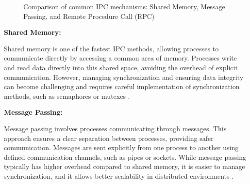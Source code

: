\vspace{1em}
\begin{figure}[H]
	\centering
	\caption{Comparison of common IPC mechanisms: Shared Memory, Message Passing, and Remote Procedure Call (RPC)}
	\label{fig:ipc_methods}
\end{figure}

\vspace{1em}
\textbf{Shared Memory:}

Shared memory is one of the fastest IPC methods, allowing processes to communicate directly by accessing a common area of memory. Processes write and read data directly into this shared space, avoiding the overhead of explicit communication. However, managing synchronization and ensuring data integrity can become challenging and requires careful implementation of synchronization methods, such as semaphores or mutexes \cite{stallings2018, ipc_performance_analysis}.

\vspace{1em}
\textbf{Message Passing:}

\vspace{0.4em}
Message passing involves processes communicating through messages. This approach ensures a clear separation between processes, providing safer communication. Messages are sent explicitly from one process to another using defined communication channels, such as pipes or sockets. While message passing typically has higher overhead compared to shared memory, it is easier to manage synchronization, and it allows better scalability in distributed environments \cite{tanenbaum2015}.

